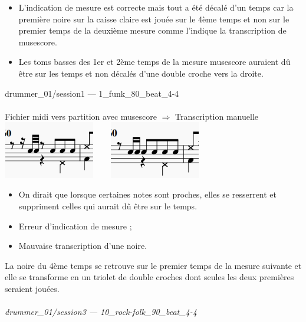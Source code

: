 \begin{itemize}
	\item L’indication de mesure est correcte mais tout a été décalé d’un temps car la première noire sur la caisse claire est jouée sur le 4ème temps et non sur le premier temps de la deuxième mesure comme l’indique la transcription de musescore.
	\item Les toms basses des 1er et 2ème temps de la mesure musescore auraient dû être sur les temps et non décalés d’une double croche vers la droite.\\
\end{itemize}
drummer\_01/session1 — 1\_funk\_80\_beat\_4-4\\\\
Fichier midi vers partition avec musescore $\Rightarrow$ Transcription manuelle\\
\includegraphics[height=25mm, width=40mm]{z_images/transcriptions_manuelles/0_prise_en_main/1_drummer_01__session1/musescore_0.png}\ \ \ \ 
\includegraphics[height=25mm, width=40mm]{z_images/transcriptions_manuelles/0_prise_en_main/1_drummer_01__session1/Manuelle_0.png}
\begin{itemize}
	\item On dirait que lorsque certaines notes sont proches, elles se resserrent et suppriment celles qui aurait dû être sur le temps.\\
	\item Erreur d’indication de mesure ;
	\item Mauvaise transcription d’une noire.\\
\end{itemize}
La noire du 4ème temps se retrouve sur le premier temps de la mesure suivante et elle se transforme en un triolet de double croches dont seules les deux premières seraient jouées.\\\\
\textit{drummer\_01/session3 — 10\_rock-folk\_90\_beat\_4-4}\\\\
